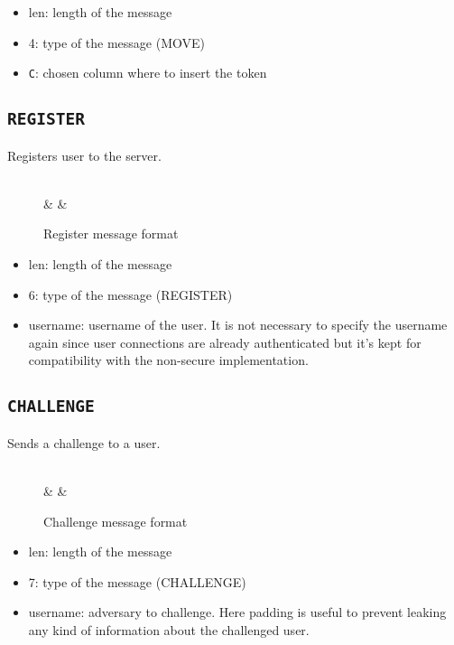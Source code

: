\begin{itemize}
	\item len: length of the message
	\item 4: type of the message (MOVE)
	\item \texttt{C}: chosen column where to insert the token
\end{itemize}


\subsection{\texttt{REGISTER}}
Registers user to the server.
\begin{figure}[h]
	\centering
	\begin{bytefield}[bitwidth=1.1em]{32}
		 \\
		& 
		& 
	\end{bytefield}
	\caption{Register message format}
\end{figure}

\begin{itemize}
	\item len: length of the message
	\item 6: type of the message (REGISTER)
	\item username: username of the user. It is not necessary to specify the 
		username again since user connections are already authenticated
		but it's kept for compatibility with the non-secure implementation.
\end{itemize}

\subsection{\texttt{CHALLENGE}}
Sends a challenge to a user.
\begin{figure}[h]
	\centering
	\begin{bytefield}[bitwidth=1.1em]{32}
		 \\
		& 
		& 
	\end{bytefield}
	\caption{Challenge message format}
\end{figure}

\begin{itemize}
	\item len: length of the message
	\item 7: type of the message (CHALLENGE)
	\item username: adversary to challenge. Here padding is useful to prevent 
		leaking any kind of information about the challenged user.
\end{itemize}

